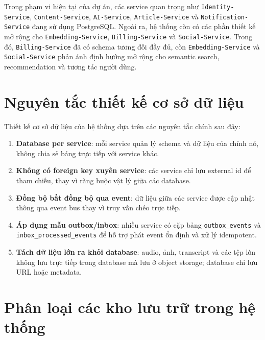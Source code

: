\documentclass[12pt,a4paper]{report}
\begin{document}
Trong phạm vi hiện tại của dự án, các service quan trọng như \texttt{Identity-Service}, \texttt{Content-Service}, \texttt{AI-Service}, \texttt{Article-Service} và \texttt{Notification-Service} đang sử dụng PostgreSQL. Ngoài ra, hệ thống còn có các phần thiết kế mở rộng cho \texttt{Embedding-Service}, \texttt{Billing-Service} và \texttt{Social-Service}. Trong đó, \texttt{Billing-Service} đã có schema tương đối đầy đủ, còn \texttt{Embedding-Service} và \texttt{Social-Service} phản ánh định hướng mở rộng cho semantic search, recommendation và tương tác người dùng.

\section{Nguyên tắc thiết kế cơ sở dữ liệu}

Thiết kế cơ sở dữ liệu của hệ thống dựa trên các nguyên tắc chính sau đây:

\begin{enumerate}[label=\arabic*.]
    \item \textbf{Database per service}: mỗi service quản lý schema và dữ liệu của chính nó, không chia sẻ bảng trực tiếp với service khác.
    \item \textbf{Không có foreign key xuyên service}: các service chỉ lưu external id để tham chiếu, thay vì ràng buộc vật lý giữa các database.
    \item \textbf{Đồng bộ bất đồng bộ qua event}: dữ liệu giữa các service được cập nhật thông qua event bus thay vì truy vấn chéo trực tiếp.
    \item \textbf{Áp dụng mẫu outbox/inbox}: nhiều service có cặp bảng \texttt{outbox\_events} và \texttt{inbox\_processed\_events} để hỗ trợ phát event ổn định và xử lý idempotent.
    \item \textbf{Tách dữ liệu lớn ra khỏi database}: audio, ảnh, transcript và các tệp lớn không lưu trực tiếp trong database mà lưu ở object storage; database chỉ lưu URL hoặc metadata.
\end{enumerate}

\section{Phân loại các kho lưu trữ trong hệ thống}
\end{document}
